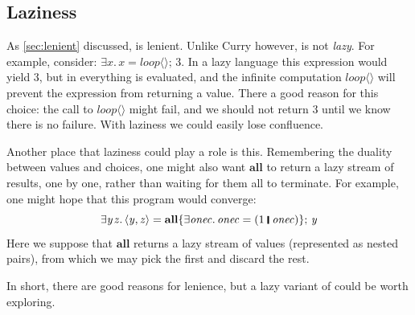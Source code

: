 \documentclass[acmsmall,review,anonymous,dvipsnames]{acmart}
\newcommand{\Varid}[1]{\mathit{#1}}
\begin{document}
\subsection{Laziness} \label{sec:laziness}

As \cref{sec:lenient} discussed, \versecalc{} is lenient. Unlike Curry however, \versecalc{} is not \emph{lazy}.
For example, consider: \ensuremath{\exists\Varid{x}.\,\Varid{x}\mathrel{=}\Varid{loop}\langle\rangle;\,\mathrm{3}}.  In a lazy language this expression would
yield \ensuremath{\mathrm{3}}, but in \versecalc{} everything is evaluated, and the infinite computation \ensuremath{\Varid{loop}\langle\rangle} will
prevent the expression from returning a value.
There a good reason for this choice: the call to \ensuremath{\Varid{loop}\langle\rangle} might fail, and we should not return \ensuremath{\mathrm{3}} until
we know there is no failure.  With laziness we could easily lose confluence.

Another place that laziness could play a role is this.
Remembering the duality between values and choices,
one might also want \ensuremath{\textbf{all}} to return a lazy stream
of results, one by one, rather than waiting for them all to terminate.  For example, one might hope that
this program would converge:
$$
\ensuremath{\exists\Varid{y}\hspace{0.3mm}\Varid{z}.\,\langle{}\Varid{y},\Varid{z}\rangle\mathrel{=}\textbf{all}\{\exists\Varid{onec}.\,\Varid{onec}\mathrel{=}(\mathrm{1}\;\rule[-0.3mm]{0.5mm}{2.5mm}\;\Varid{onec})\};\,\Varid{y}}
$$
Here we suppose that \ensuremath{\textbf{all}} returns a lazy stream of values (represented as nested
pairs), from which we may pick the first and discard the rest.

In short, there are good reasons for lenience, but
a lazy variant of \versecalc{} could be worth exploring.

\end{document}

